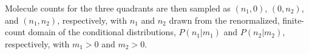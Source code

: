 \documentclass[letterpaper,english,prl,reprint,longbibliography]{revtex4-1} %
\begin{document}
Molecule counts for the three quadrants are then sampled as $(n_1,0)$, $(0,n_2)$, and $(n_1,n_2)$, respectively, with $n_1$ and $n_2$ drawn from the renormalized, finite-count domain of the conditional distributions, $P(n_1|m_1)$ and $P(n_2|m_2)$, respectively, with $m_1>0$ and $m_2>0$. 


\end{document}
